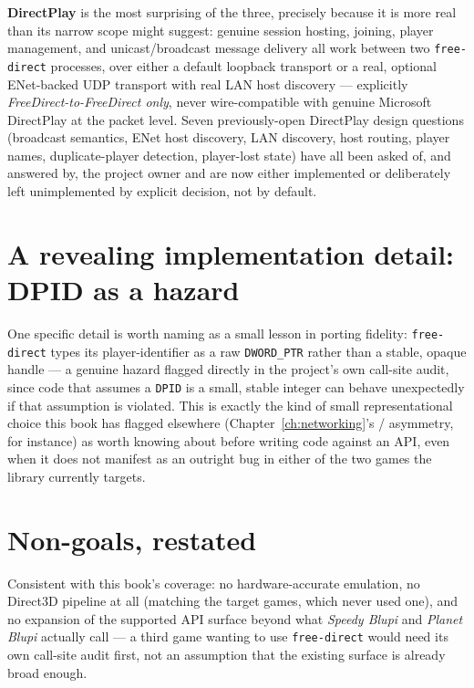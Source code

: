 \textbf{DirectPlay} is the most surprising of the three, precisely because it is more real
than its narrow scope might suggest: genuine session hosting, joining, player management, and
unicast/broadcast message delivery all work between two \texttt{free-direct} processes, over
either a default loopback transport or a real, optional ENet-backed UDP transport with real
LAN host discovery --- explicitly \emph{FreeDirect-to-FreeDirect only}, never wire-compatible
with genuine Microsoft DirectPlay at the packet level. Seven previously-open DirectPlay design
questions (broadcast semantics, ENet host discovery, LAN discovery, host routing, player
names, duplicate-player detection, player-lost state) have all been asked of, and answered by,
the project owner and are now either implemented or deliberately left unimplemented by
explicit decision, not by default.

\section{A revealing implementation detail: DPID as a hazard}

One specific detail is worth naming as a small lesson in porting fidelity: \texttt{free-direct}
types its  player-identifier as a raw \texttt{DWORD\_PTR} rather than a stable,
opaque handle --- a genuine hazard flagged directly in the project's own call-site audit,
since code that assumes a \texttt{DPID} is a small, stable integer can behave unexpectedly if
that assumption is violated. This is exactly the kind of small representational choice this
book has flagged elsewhere (Chapter~\ref{ch:networking}'s /%
  asymmetry, for instance) as worth knowing about
before writing code against an API, even when it does not manifest as an outright bug in
either of the two games the library currently targets.

\section{Non-goals, restated}

Consistent with this book's coverage: no hardware-accurate emulation, no Direct3D pipeline at
all (matching the target games, which never used one), and no expansion of the supported API
surface beyond what \emph{Speedy Blupi} and \emph{Planet Blupi} actually call --- a third
game wanting to use \texttt{free-direct} would need its own call-site audit first, not an
assumption that the existing surface is already broad enough.

